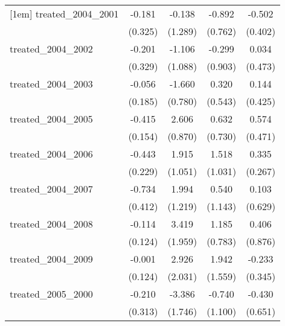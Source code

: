 {\begin{tabular}{l*{4}{c}}
[1em]
treated\_2004\_2001&      -0.181         &      -0.138         &      -0.892         &      -0.502         \\
            &     (0.325)         &     (1.289)         &     (0.762)         &     (0.402)         \\
[1em]
treated\_2004\_2002&      -0.201         &      -1.106         &      -0.299         &       0.034         \\
            &     (0.329)         &     (1.088)         &     (0.903)         &     (0.473)         \\
[1em]
treated\_2004\_2003&      -0.056         &      -1.660\sym{*}  &       0.320         &       0.144         \\
            &     (0.185)         &     (0.780)         &     (0.543)         &     (0.425)         \\
[1em]
treated\_2004\_2005&      -0.415\sym{**} &       2.606\sym{**} &       0.632         &       0.574         \\
            &     (0.154)         &     (0.870)         &     (0.730)         &     (0.471)         \\
[1em]
treated\_2004\_2006&      -0.443         &       1.915         &       1.518         &       0.335         \\
            &     (0.229)         &     (1.051)         &     (1.031)         &     (0.267)         \\
[1em]
treated\_2004\_2007&      -0.734         &       1.994         &       0.540         &       0.103         \\
            &     (0.412)         &     (1.219)         &     (1.143)         &     (0.629)         \\
[1em]
treated\_2004\_2008&      -0.114         &       3.419         &       1.185         &       0.406         \\
            &     (0.124)         &     (1.959)         &     (0.783)         &     (0.876)         \\
[1em]
treated\_2004\_2009&      -0.001         &       2.926         &       1.942         &      -0.233         \\
            &     (0.124)         &     (2.031)         &     (1.559)         &     (0.345)         \\
[1em]
treated\_2005\_2000&      -0.210         &      -3.386         &      -0.740         &      -0.430         \\
            &     (0.313)         &     (1.746)         &     (1.100)         &     (0.651)         \\

\end{tabular}}
